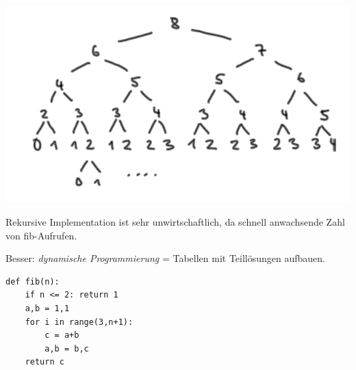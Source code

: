 \documentclass{beamer}
\begin{document}
\begin{frame}[fragile]

\includegraphics[scale=0.7]{fib.png} \pause

Rekursive Implementation ist sehr unwirtschaftlich, da schnell anwachsende Zahl von fib-Aufrufen.

\end{frame}

\begin{frame}[fragile]
Besser: \textit{dynamische Programmierung} = Tabellen mit Teillösungen aufbauen. \pause

\begin{lstlisting} 
def fib(n):
    if n <= 2: return 1
    a,b = 1,1
    for i in range(3,n+1):
        c = a+b
        a,b = b,c
    return c
\end{lstlisting} 

\end{frame}
\end{document}

